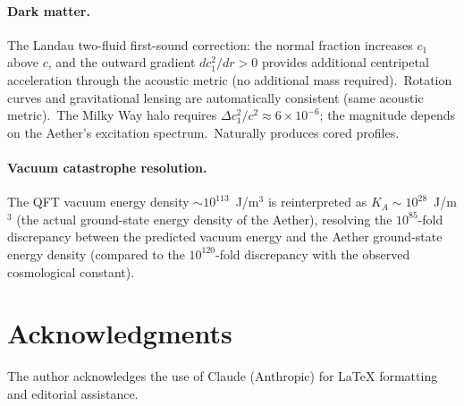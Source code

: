 ﻿\documentclass[12pt,letterpaper]{article}
\newcommand{\Ka}{K_{\!A}}
\begin{document}
\paragraph{Dark matter.}
The Landau two-fluid first-sound correction: the normal fraction increases
$c_1$ above $c$, and the outward gradient $dc_1^2/dr > 0$ provides additional
centripetal acceleration through the acoustic metric (no additional mass
required).\ Rotation curves and gravitational lensing are automatically
consistent (same acoustic metric).\ The Milky Way halo requires
$\Delta c_1^2/c^2 \approx 6 \times 10^{-6}$; the magnitude depends on
the Aether's excitation spectrum.\ Naturally produces cored profiles.

\paragraph{Vacuum catastrophe resolution.}
The QFT vacuum energy density $\sim 10^{113}$~J/m$^3$ is reinterpreted as
$\Ka \sim 10^{28}$~J/m$^3$ (the actual ground-state energy density of the
Aether), resolving the $10^{85}$-fold discrepancy between the predicted vacuum energy and the Aether ground-state energy density (compared to the $10^{120}$-fold discrepancy with the observed cosmological constant).



\section*{Acknowledgments}

The author acknowledges the use of Claude (Anthropic) for \LaTeX{} formatting
and editorial assistance.

\bigskip


\end{document}
